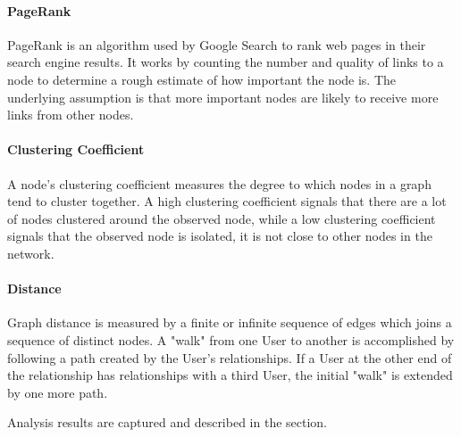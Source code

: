 \paragraph{PageRank} PageRank is an algorithm used by Google Search to rank web pages in their search engine results. It works by counting the number and quality of links to a node to determine a rough estimate of how important the node is. The underlying assumption is that more important nodes are likely to receive more links from other nodes\cite{wikipedia2022pagerank}.

\paragraph{Clustering Coefficient} A node's clustering coefficient measures the degree to which nodes in a graph tend to cluster together. A high clustering coefficient signals that there are a lot of nodes clustered around the observed node, while a low clustering coefficient signals that the observed node is isolated, it is not close to other nodes in the network. 

\paragraph{Distance} Graph distance is measured by a finite or infinite sequence of edges which joins a sequence of distinct nodes. A "walk" from one User to another is accomplished by following a path created by the User's relationships. If a User at the other end of the relationship has relationships with a third User, the initial "walk" is extended by one more path.

Analysis results are captured and described in the  section.
